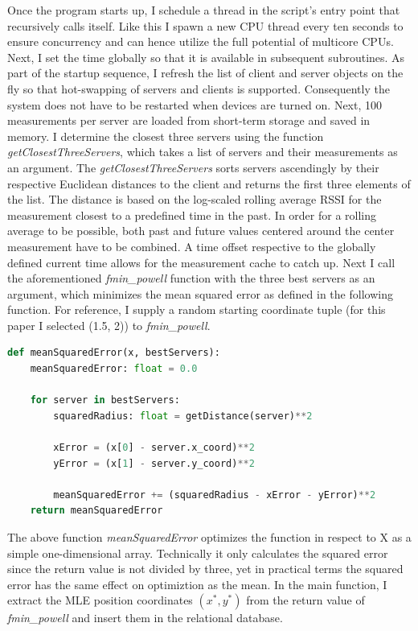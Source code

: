 \documentclass[a4paper, oneside]{ipsreport}
\begin{document}
Once the program starts up, I schedule a thread in the script's entry point that recursively calls itself. Like this I spawn a new CPU thread every ten seconds to ensure concurrency and can hence utilize the full potential of multicore CPUs. Next, I set the time globally so that it is available in subsequent subroutines. As part of the startup sequence, I refresh the list of client and server objects on the fly so that hot-swapping of servers and clients is supported. Consequently the system does not have to be restarted when devices are turned on. Next, 100 measurements per server are loaded from short-term storage and saved in memory. I determine the closest three servers using the function \emph{getClosestThreeServers}, which takes a list of servers and their measurements as an argument. The \emph{getClosestThreeServers} sorts servers ascendingly by their respective Euclidean distances to the client and returns the first three elements of the list. The distance is based on the log-scaled rolling average RSSI for the measurement closest to a predefined time in the past. In order for a rolling average to be possible, both past and future values centered around the center measurement have to be combined. A time offset respective to the globally defined current time allows for the measurement cache to catch up. Next I call the aforementioned \emph{fmin\_powell} function with the three best servers as an argument, which minimizes the mean squared error as defined in the following function. For reference, I supply a random starting coordinate tuple (for this paper I selected (1.5, 2)) to \emph{fmin\_powell}.

\begin{lstlisting}[language=Python, caption=Mean squared error]
	def meanSquaredError(x, bestServers):
    meanSquaredError: float = 0.0

    for server in bestServers:
        squaredRadius: float = getDistance(server)**2

        xError = (x[0] - server.x_coord)**2
        yError = (x[1] - server.y_coord)**2

        meanSquaredError += (squaredRadius - xError - yError)**2
    return meanSquaredError
\end{lstlisting}

The above function \emph{meanSquaredError} optimizes the function in respect to X as a simple one-dimensional array. Technically it only calculates the squared error since the return value is not divided by three, yet in practical terms the squared error has the same effect on optimiztion as the mean. In the main function, I extract the MLE position coordinates $(x^*, y^*)$ from the return value of \emph{fmin\_powell} and insert them in the relational database.
\end{document}
